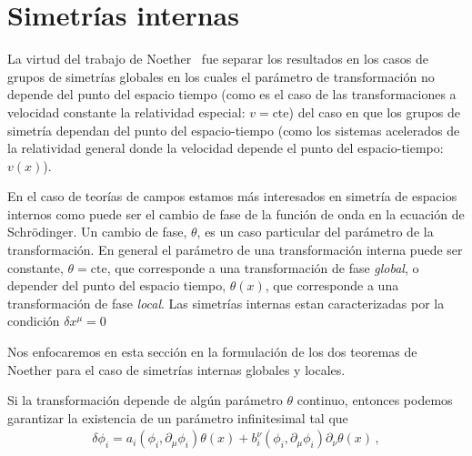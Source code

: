 \section{Simetrías internas}
La virtud del trabajo de Noether~\cite{Noether} fue separar los resultados  en los casos de grupos de simetrías globales en los cuales el parámetro de transformación no depende del punto del espacio tiempo (como es el caso de las transformaciones a velocidad constante la relatividad especial: $v=\text{cte}$) del caso en que los grupos de simetría dependan del punto del espacio-tiempo (como los sistemas acelerados de la relatividad general donde la velocidad depende el punto del espacio-tiempo: $v(x)$).

En el caso de teorías de campos estamos más interesados en simetría de espacios internos como puede ser el cambio de fase de la función de onda en la ecuación de Schrödinger. Un cambio de fase, $\theta$, es un caso particular del parámetro de la transformación. En general el parámetro de una transformación interna puede ser constante, $\theta=\text{cte}$, que corresponde a una transformación de fase  \emph{global}, o depender del punto del espacio tiempo, $\theta(x)$, que corresponde  a una transformación  de fase \emph{local}. Las simetrías internas estan caracterizadas por la condición $\delta x^\mu=0$ 

Nos enfocaremos en esta sección en la formulación de los dos teoremas de Noether para el caso de simetrías internas globales y locales.   


Si la transformación depende de algún parámetro $\theta$ continuo, entonces podemos garantizar la existencia de un parámetro infinitesimal tal que
\begin{align}
\label{eq:infdt}
 \delta\phi_i= a_{i}\left( \phi_{i},\partial_{\mu}\phi_{i} \right) \theta(x)+b^{\nu}_i \left( \phi_{i},\partial_{\mu}\phi_{i} \right) \partial_{\nu}\theta(x)\,,
\end{align}

